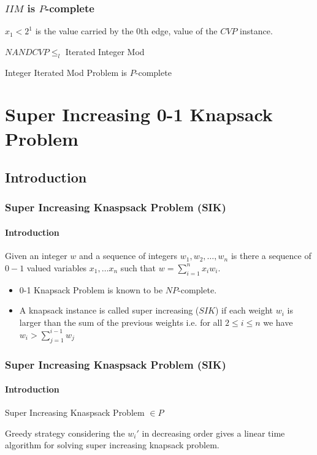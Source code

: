 \documentclass[article,10pt]{beamer}%
\begin{document}
\begin{frame}
	\frametitle{$IIM$ is $P$-complete}

$x_1< 2^{1}$ is the value carried by the $0$th edge, value of the $CVP$ instance. 
\begin{theorem}
		$NANDCVP\leq_l $ Iterated Integer Mod
\end{theorem}
	 	\vspace{5mm}
	 	
	\begin{theorem}
		Integer Iterated Mod Problem is $P$-complete
	\end{theorem}
\end{frame}

\section{Super Increasing 0-1 Knapsack Problem}
\subsection{Introduction}
\begin{frame}
\frametitle{Super Increasing Knaspsack Problem (SIK)}
\framesubtitle{Introduction}
\begin{definition}
	Given an integer $w$ and a sequence of integers $w_1,w_2,\dots, w_n$ is there a sequence of $0-1$ valued variables $x_1,\dots x_n$ such that $w=\sum\limits_{i=1}^n x_iw_i$.
\end{definition}
\begin{itemize}
	\item 0-1 Knapsack Problem is known to be $NP$-complete. \cite{guidetonpc}
	\item A knapsack instance is called super increasing ($SIK$) if each weight $w_i$ is larger than the sum of the previous weights i.e. for all $2\leq i\leq n$ we have $w_i>\sum\limits_{j=1}^{i-1}w_j$
\end{itemize}
\end{frame}
\begin{frame}
	\frametitle{Super Increasing Knaspsack Problem (SIK)}
	\framesubtitle{Introduction}
\begin{theorem}
	Super Increasing Knaspsack Problem $\in P$
\end{theorem}\vspace{5mm}

Greedy strategy considering the $w_i'$ in decreasing order gives a linear time algorithm for solving super increasing knapsack problem.
\end{frame}
\end{document}
